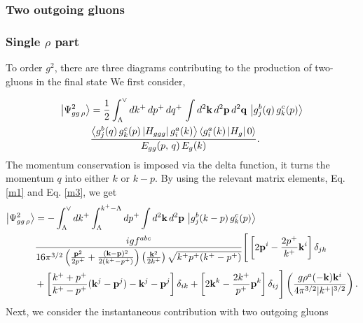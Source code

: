 \documentclass[a4paper,11pt]{article}
\begin{document}
\subsubsection{Two outgoing gluons}
\subsubsection*{Single $\rho$ part}
To order $g^2$, there are three  diagrams contributing to the production of two-gluons in the final state We first consider,

\begin{figure}[htbp]
\centering
\end{figure}
\begin{align}\label{ggtwo}
\left|\Psi_{gg\,\rho}^{2}\right\rangle & = \frac{1}{2}\int_{\Lambda}^{\vee}dk^{+}\, dp^{+}\, dq^{+}\,\int d^{2}\mathbf{k}\, d^{2}\mathbf{p}\, d^{2}\mathbf{q}\, \left|g_{j}^{b}(q)\, g_{k}^{c}(p)\right\rangle\notag \\ &  \frac{\left\langle g_{j}^{b}(q)\, g_{k}^{c}(p)\left|H_{ggg}\right|g_{i}^{a}(k)\right\rangle \left\langle g_{i}^{a}(k)\left|H_{g}\right|0\right\rangle }{E_{gg}(p,\, q)\, E_{g}(k)}.
\end{align}
The momentum conservation is imposed via the delta function, it turns the momentum $q$ into either $k$ or $k-p$. By using the relevant matrix elements, Eq. \eqref{m1} and Eq. \eqref{m3}, we get
\begin{align}\label{ggmid}
\left|\Psi_{gg\,\rho}^{2}\right\rangle 
&=-\int_{\Lambda}^{\vee}dk^{+}\int_{\Lambda}^{k^{+}-\Lambda}dp^{+}\int d^{2}\mathbf{k}\,d^{2}\mathbf{p}\, \left|g_{j}^{b}(k-p)\, g_{k}^{c}(p)\right\rangle\,\notag \\ & \frac{igf^{abc}}{16\pi^{3/2}\left(\frac{\mathbf{p}^{2}}{2p^{+}}+\frac{(\mathbf{k}-\mathbf{p})^{2}}{2(k^{+}-p^{+})}\right)\left(\frac{\mathbf{k}^{2}}{2k^{+}}\right)\sqrt{k^{+}p^{+}(k^{+}-p^{+})}}
\Bigg[\left[2\mathbf{p}^{i}-\frac{2p^{+}}{k^{+}}\mathbf{k}^{i}\right]\delta_{jk}\notag \\ & +\left[\frac{k^{+}+p^{+}}{k^{+}-p^{+}}(\mathbf{k}^{j}-\mathbf{p}^{j})-\mathbf{k}^{j}-\mathbf{p}^{j}\right]\delta_{ik}+\left[2\mathbf{k}^{k}-\frac{2k^{+}}{p^{+}}\mathbf{p}^{k}\right]\delta_{ij}\Bigg]
 \left(\frac{g\rho^{a}(-\mathbf{k})\mathbf{k}^{i}}{4\pi^{3/2}|k^{+}|^{3/2}}\right). 
\end{align}
Next, we consider the instantaneous contribution with two outgoing gluons
\end{document}
